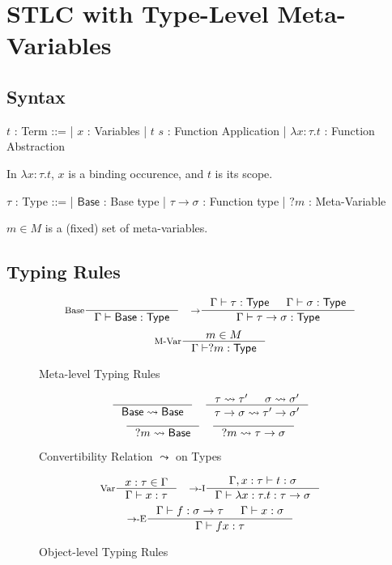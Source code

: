 \documentclass[a4paper]{report}
\newcommand{\Base}[0]{\mathsf{Base}}
\newcommand{\Type}[0]{\mathsf{Type}}
\newcommand{\Intro}[1]{#1-\textrm{I}}
\newcommand{\Elim}[1]{#1-\textrm{E}}
\newcommand{\Conv}[2]{#1 \leadsto #2}
\begin{document}
\newpage
\section{STLC with Type-Level Meta-Variables}
\subsection{Syntax}
\begin{bnf}
$t$ : \textsf{Term} ::=
| $x$ : Variables
| $t$ $s$ : Function Application
| $\lambda x \colon \tau. t$ : Function Abstraction
\end{bnf}

\hfill\break
In $\lambda x \colon \tau. t$, $x$ is a binding occurence, and $t$ is its scope.

\noindent
\begin{bnf}
$\tau$ : \textsf{Type} ::=
| $\Base$ : Base type
| $\tau \to \sigma$ : Function type
| $?m$ : Meta-Variable
\end{bnf}

$m \in M$ is a (fixed) set of meta-variables.

\subsection{Typing Rules}
\begin{figure*}[h]
   \[
    \inference[Base]{}
                    {\Gamma \vdash \Base : \Type}
    \quad
    \inference[$\to$]{\Gamma \vdash \tau : \Type & \Gamma \vdash \sigma : \Type}
                     {\Gamma \vdash \tau \to \sigma : \Type}
  \]
   \[
    \inference[M-Var]{m \in M}
                     {\Gamma \vdash ?m : \Type}
  \]
  
  \caption*{Meta-level Typing Rules}
  \label{fig:base-stlc-mltr}
\end{figure*}

\begin{figure*}[h]
   \[
    \inference[]{}
                {\Conv{\Base}{\Base}}
    \quad
    \inference[]{\Conv{\tau}{\tau'} & \Conv{\sigma}{\sigma'}}
                {\Conv{\tau \to \sigma}{\tau' \to \sigma'}}
  \]
   \[
    \inference[]{}
                {\Conv{?m}{\Base}}
    \quad
    \inference[]{}
                {\Conv{?m}{\tau \to \sigma}}
  \]
  
  \caption*{Convertibility Relation $\Conv{}{}$ on Types}
  \label{fig:base-stlc-mltr}
\end{figure*}

\begin{figure*}[h]
  \[
    \inference[Var]{x : \tau \in \Gamma}
                   {\Gamma \vdash x : \tau}
    \quad
    \inference[\Intro{$\to$}]{\Gamma, x : \tau \vdash t : \sigma}
                             {\Gamma \vdash \lambda x : \tau. t : \tau \to \sigma}
  \]
  \[
    \inference[\Elim{$\to$}]{\Gamma \vdash f : \sigma \to \tau & \Gamma \vdash x : \sigma}
                            {\Gamma \vdash f x : \tau}
  \]
  
  \caption*{Object-level Typing Rules}
  \label{fig:base-stlc-oltr}
\end{figure*}
\end{document}
